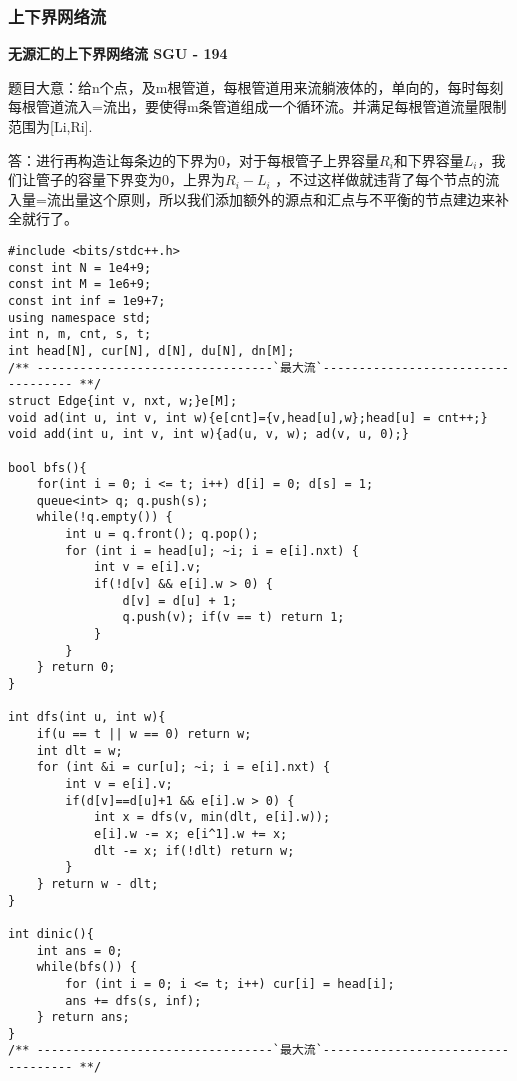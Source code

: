 \subsubsection{上下界网络流}

{\bfseries 无源汇的上下界网络流  SGU - 194}

题目大意：给n个点，及m根管道，每根管道用来流躺液体的，单向的，每时每刻每根管道流入=流出，要使得m条管道组成一个循环流。并满足每根管道流量限制范围为[Li,Ri]. 



答：进行再构造让每条边的下界为0，对于每根管子上界容量$R_i$和下界容量$L_i$，我们让管子的容量下界变为0，上界为$R_i-L_i$ ，不过这样做就违背了每个节点的流入量=流出量这个原则，所以我们添加额外的源点和汇点与不平衡的节点建边来补全就行了。


\begin{lstlisting}
#include <bits/stdc++.h>
const int N = 1e4+9;
const int M = 1e6+9;
const int inf = 1e9+7;
using namespace std;
int n, m, cnt, s, t;
int head[N], cur[N], d[N], du[N], dn[M];
/** ---------------------------------`最大流`----------------------------------- **/
struct Edge{int v, nxt, w;}e[M];
void ad(int u, int v, int w){e[cnt]={v,head[u],w};head[u] = cnt++;}
void add(int u, int v, int w){ad(u, v, w); ad(v, u, 0);}

bool bfs(){
    for(int i = 0; i <= t; i++) d[i] = 0; d[s] = 1;
    queue<int> q; q.push(s);
    while(!q.empty()) {
        int u = q.front(); q.pop();
        for (int i = head[u]; ~i; i = e[i].nxt) {
            int v = e[i].v;
            if(!d[v] && e[i].w > 0) {
                d[v] = d[u] + 1;
                q.push(v); if(v == t) return 1;
            }
        }
    } return 0;
}

int dfs(int u, int w){
    if(u == t || w == 0) return w;
    int dlt = w;
    for (int &i = cur[u]; ~i; i = e[i].nxt) {
        int v = e[i].v;
        if(d[v]==d[u]+1 && e[i].w > 0) {
            int x = dfs(v, min(dlt, e[i].w));
            e[i].w -= x; e[i^1].w += x;
            dlt -= x; if(!dlt) return w;
        }
    } return w - dlt;
}

int dinic(){
    int ans = 0;
    while(bfs()) {
        for (int i = 0; i <= t; i++) cur[i] = head[i];
        ans += dfs(s, inf);
    } return ans;
}
/** ---------------------------------`最大流`----------------------------------- **/


\end{lstlisting}
